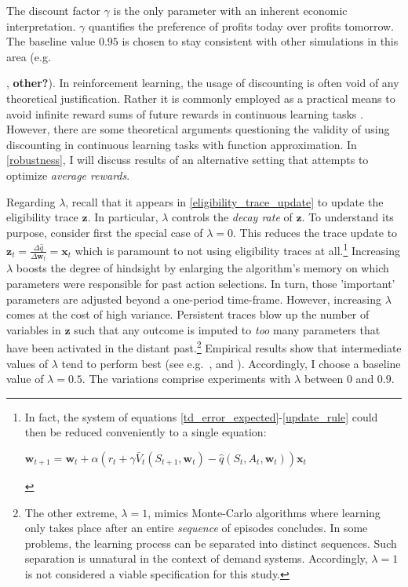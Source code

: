 The discount factor $\gamma$ is the only parameter with an inherent economic interpretation. $\gamma$ quantifies the preference of profits today over profits tomorrow. The baseline value $0.95$ is chosen to stay consistent with other simulations in this area (e.g.\ {\textcite{calvano_algorithmic_2018}, \textcite{klein_autonomous_2019} \textbf{other?}). In reinforcement learning, the usage of discounting is often void of any theoretical justification. Rather it is commonly employed as a practical means to avoid infinite reward sums of future rewards in continuous learning tasks \parencite{schwartz_reinforcement_1993}. However, there are some theoretical arguments questioning the validity of using discounting in continuous learning tasks with function approximation. In \autoref{robustness}, I will discuss results of an alternative setting that attempts to optimize \emph{average rewards}.

Regarding $\lambda$, recall that it appears in \autoref{eligibility_trace_update} to update the eligibility trace $\boldsymbol{z}$. In particular, $\lambda$ controls the \emph{decay rate} of $\boldsymbol{z}$. To understand its purpose, consider first the special case of $\lambda = 0$. This reduces the trace update to $\boldsymbol{z}_t = \frac{\Delta \hat{q}}{\Delta \boldsymbol{w}_t} = \boldsymbol{x}_t$ which is paramount to not using eligibility traces at all.\footnote{In fact, the system of equations \ref{td_error_expected}-\ref{update_rule} could then be reduced conveniently to a single equation:
	\begin{center}
		$\boldsymbol{w}_{t+1} = \boldsymbol{w}_t + \alpha (r_t + \gamma \bar{V}_t(S_{t+1}, \boldsymbol{w}_t) - \hat{q}(S_t, A_t, \boldsymbol{w}_t)) \boldsymbol{x}_t$
	\end{center}
} Increasing $\lambda$ boosts the degree of hindsight by enlarging the algorithm's memory on which parameters were responsible for past action selections. In turn, those 'important' parameters are adjusted beyond a one-period time-frame. However, increasing $\lambda$ comes at the cost of high variance. Persistent traces blow up the number of variables in $\boldsymbol{z}$ such that any outcome is imputed to \emph{too} many parameters that have been activated in the distant past.\footnote{The other extreme, $\lambda = 1$, mimics Monte-Carlo algorithms where learning only takes place after an entire \emph{sequence} of episodes concludes. In some problems, the learning process can be separated into distinct sequences. Such separation is unnatural in the context of demand systems. Accordingly, $\lambda = 1$ is not considered a viable specification for this study.} Empirical results show that intermediate values of $\lambda$ tend to perform best (see e.g.\ \textcite{sutton_1988}, \textcite{rummery_niranjan_1994} and \textcite{sutton_reinforcement_2018}). Accordingly, I choose a baseline value of $\lambda = 0.5$. The variations comprise experiments with $\lambda$ between $0$ and $0.9$.

}
